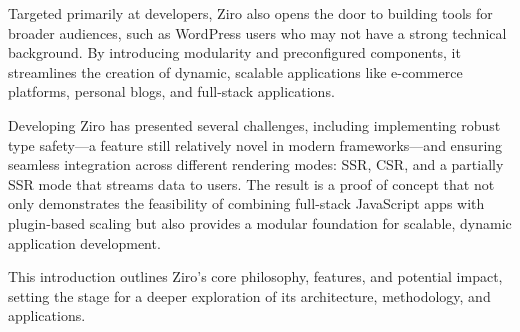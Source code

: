Targeted primarily at developers, Ziro also opens the door to building tools for broader audiences, such as WordPress users who may not have a strong technical background. By introducing modularity and preconfigured components, it streamlines the creation of dynamic, scalable applications like e-commerce platforms, personal blogs, and full-stack applications.

Developing Ziro has presented several challenges, including implementing robust type safety—a feature still relatively novel in modern frameworks—and ensuring seamless integration across different rendering modes: SSR, CSR, and a partially SSR mode that streams data to users. The result is a proof of concept that not only demonstrates the feasibility of combining full-stack JavaScript apps with plugin-based scaling but also provides a modular foundation for scalable, dynamic application development.

This introduction outlines Ziro’s core philosophy, features, and potential impact, setting the stage for a deeper exploration of its architecture, methodology, and applications.



\pagebreak
